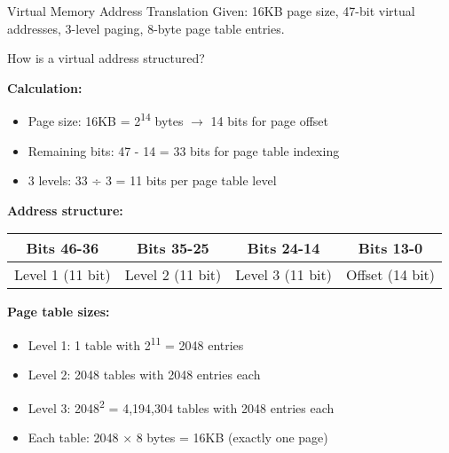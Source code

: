 \begin{example2}{Virtual Memory Address Translation}
    Given: 16KB page size, 47-bit virtual addresses, 3-level paging, 8-byte page table entries.
    
    How is a virtual address structured?
    
    \tcblower
    
    \textbf{Calculation:}
    \begin{itemize}
        \item Page size: 16KB = 2\textsuperscript{14} bytes $\rightarrow$ 14 bits for page offset
        \item Remaining bits: 47 - 14 = 33 bits for page table indexing
        \item 3 levels: 33 ÷ 3 = 11 bits per page table level
    \end{itemize}
    
    \textbf{Address structure:}
    \begin{tabular}{|c|c|c|c|}
        \hline
        Bits 46-36 & Bits 35-25 & Bits 24-14 & Bits 13-0 \\
        \hline
        Level 1 (11 bit) & Level 2 (11 bit) & Level 3 (11 bit) & Offset (14 bit) \\
        \hline
    \end{tabular}
    
    \textbf{Page table sizes:}
    \begin{itemize}
        \item Level 1: 1 table with 2\textsuperscript{11} = 2048 entries
        \item Level 2: 2048 tables with 2048 entries each
        \item Level 3: 2048\textsuperscript{2} = 4,194,304 tables with 2048 entries each
        \item Each table: 2048 × 8 bytes = 16KB (exactly one page)
    \end{itemize}
\end{example2}

